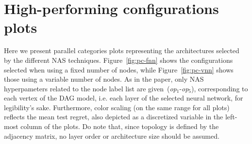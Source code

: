 \section{High-performing configurations plots}
Here we present parallel categories plots representing the architectures selected by the different NAS techniques. Figure~\ref{fig:pc-fnn} shows the configurations selected when using a fixed number of nodes, while Figure~\ref{fig:pc-vnn} shows those using a variable number of nodes. As in the paper, only NAS hyperpameters related to the node label list are given~(\textit{op$_1$}-\textit{op$_5$}), corresponding to each vertex of the DAG model, i.e. each layer of the selected neural network, for legibility's sake. Furthermore, color scaling (on the same range for all plots) reflects the mean test regret, also depicted as a discretized variable in the left-most column of the plots. Do note that, since topology is defined by the adjacency matrix, no layer order or architecture size should be assumed.

